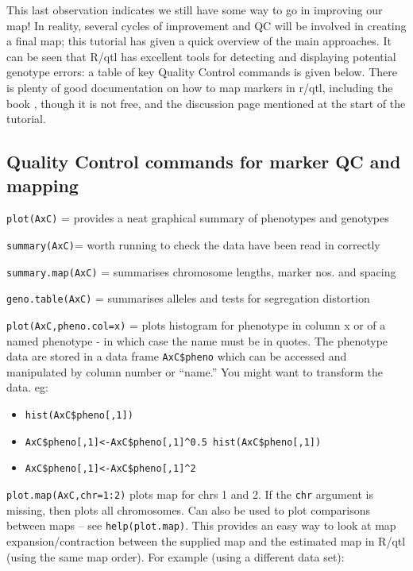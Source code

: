 \documentclass[
]{book}
\providecommand{\tightlist}{%
  \setlength{\itemsep}{0pt}\setlength{\parskip}{0pt}}
\begin{document}
This last observation indicates we still have some way to go in improving our map! In reality, several cycles of improvement and QC will be involved in creating a final map; this tutorial has given a quick overview of the main approaches. It can be seen that R/qtl has excellent tools for detecting and displaying potential genotype errors: a table of key Quality Control commands is given below. There is plenty of good documentation on how to map markers in r/qtl, including the book \citet{broman_guide_2009}, though it is not free, and the discussion page mentioned at the start of the tutorial.

\hypertarget{quality-control-commands-for-marker-qc-and-mapping}{%
\subsection{Quality Control commands for marker QC and mapping}\label{quality-control-commands-for-marker-qc-and-mapping}}

\texttt{plot(AxC)} = provides a neat graphical summary of phenotypes and genotypes

\texttt{summary(AxC)}= worth running to check the data have been read in correctly

\texttt{summary.map(AxC)} = summarises chromosome lengths, marker nos. and spacing

\texttt{geno.table(AxC)} = summarises alleles and tests for segregation distortion

\texttt{plot(AxC,pheno.col=x)} = plots histogram for phenotype in column x or of a named phenotype - in which case the name must be in quotes. The phenotype data are stored in a data frame \texttt{AxC\$pheno} which can be accessed and manipulated by column number or ``name.'' You might want to transform the data. eg:

\begin{itemize}
\tightlist
\item
  \texttt{hist(AxC\$pheno{[},1{]})}
\item
  \texttt{AxC\$pheno{[},1{]}\textless{}-AxC\$pheno{[},1{]}\^{}0.5\ hist(AxC\$pheno{[},1{]})}
\item
  \texttt{AxC\$pheno{[},1{]}\textless{}-AxC\$pheno{[},1{]}\^{}2}
\end{itemize}

\texttt{plot.map(AxC,chr=1:2)} plots map for chrs 1 and 2. If the \texttt{chr} argument is missing,
then plots all chromosomes. Can also be used to plot comparisons between maps -- see \texttt{help(plot.map)}. This provides an easy way to look at map expansion/contraction between the supplied map and the estimated map in R/qtl (using the same map order). For example (using a different data set):
\end{document}
